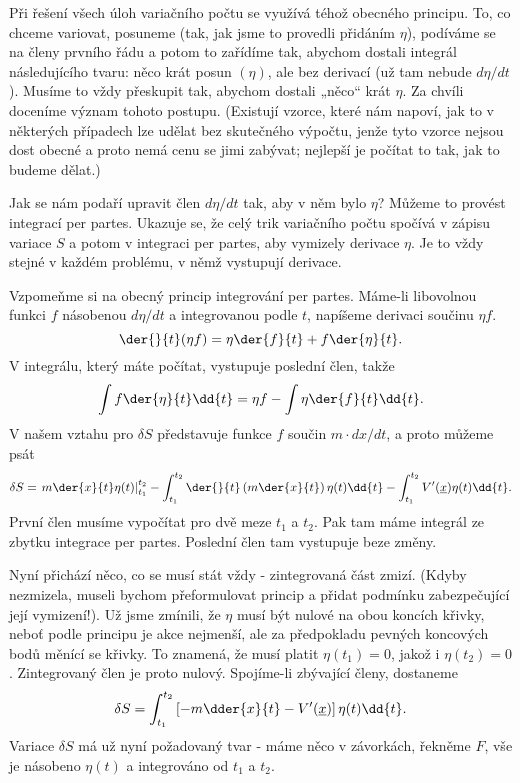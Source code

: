     Při řešení všech úloh variačního počtu se využívá téhož obecného principu. To, co chceme
    variovat, posuneme (tak, jak jsme to provedli přidáním \(\eta\)), podíváme se na členy prvního
    řádu a potom to zařídíme tak, abychom dostali integrál následujícího tvaru: něco krát posun
    \((\eta)\), ale bez derivací (už tam nebude \(d\eta/dt\)). Musíme to vždy přeskupit tak, abychom
    dostali „něco“ krát \(\eta\). Za chvíli doceníme význam tohoto postupu. (Existují vzorce, které
    nám napoví, jak to v některých případech lze udělat bez skutečného výpočtu, jenže tyto vzorce
    nejsou dost obecné a proto nemá cenu se jimi zabývat; nejlepší je počítat to tak, jak to budeme
    dělat.)

    Jak se nám podaří upravit člen \(d\eta/dt\) tak, aby v něm bylo \(\eta\)? Můžeme to provést
    integrací per partes. Ukazuje se, že celý trik variačního počtu spočívá v zápisu variace \(S\) a
    potom v integraci per partes, aby vymizely derivace \(\eta\). Je to vždy stejné v každém
    problému, v němž vystupují derivace. 
    
    Vzpomeňme si na obecný princip integrování per partes. Máme-li libovolnou funkci \(f\) násobenou
    \(d\eta/dt\) a integrovanou podle \(t\), napíšeme derivaci součinu \(\eta f\).
    \begin{equation*}
      \der{}{t}(\eta f) = \eta\der{f}{t} + f\der{\eta}{t}.
    \end{equation*}  
    V integrálu, který máte počítat, vystupuje poslední člen, takže
    \begin{equation*}
      \int f\der{\eta}{t}\dd{t} = \eta f - \int\eta\der{f}{t}\dd{t}.
    \end{equation*}  
    V našem vztahu pro \(\delta S\) představuje funkce \(f\) součin \(m\cdot dx/dt\), a proto můžeme
    psát
    \begin{equation*}
      \delta S = \left.m\der{x}{t}\eta(t)\right\rvert^{t_2}_{t_1} 
               - \int^{t_2}_{t_1}\der{}{t}\left(m\der{x}{t}\right)\eta(t)\dd{t}
               - \int^{t_2}_{t_1} V'(\underline{x})\eta(t)\dd{t}.
    \end{equation*} 
    První člen musíme vypočítat pro dvě meze \(t_1\) a \(t_2\). Pak tam máme integrál ze zbytku
    integrace per partes. Poslední člen tam vystupuje beze změny.

    Nyní přichází něco, co se musí stát vždy - zintegrovaná část zmizí. (Kdyby nezmizela, museli
    bychom přeformulovat princip a přidat podmínku zabezpečující její vymizení!). Už jsme zmínili,
    že \(\eta\) musí být nulové na obou koncích křivky, neboť podle principu je akce nejmenší, ale
    za předpokladu pevných koncových bodů měnící se křivky. To znamená, že musí platit \(\eta(t_1)
    =0\), jakož i \(\eta(t_2) = 0\). Zintegrovaný člen je proto nulový. Spojíme-li zbývající členy,
    dostaneme
    \begin{equation*}
      \delta S = \int^{t_2}_{t_1}\left[-m\dder{x}{t} -V'(\underline{x})\right]\eta(t)\dd{t}.
    \end{equation*} 
    Variace \(\delta S\) má už nyní požadovaný tvar - máme něco v závorkách, řekněme \(F\), vše je
    násobeno \(\eta(t)\) a integrováno od \(t_1\) a \(t_2\).

